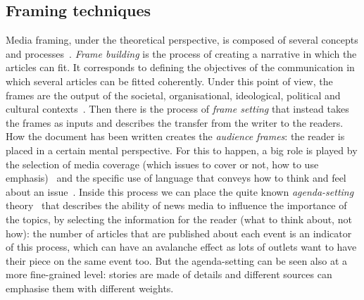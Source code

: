 \subsection{Framing techniques}
\label{ssec:lit_framing_theory}


Media framing, under the theoretical perspective, is composed of several concepts and processes~\cite{scheufele2007framing}.
\textit{Frame building} is the process of creating a narrative in which the articles can fit. It corresponds to defining the objectives of the communication in which several articles can be fitted coherently. Under this point of view, the frames are the output of the societal, organisational, ideological, political and cultural contexts~\cite{scheufele1999framing}.
Then there is the process of \textit{frame setting} that instead takes the frames as inputs and describes the transfer from the writer to the readers. How the document has been written creates the \emph{audience frames}: the reader is placed in a certain mental perspective. For this to happen, a big role is played by the selection of media coverage (which issues to cover or not, how to use emphasis)~\cite{iyengar1994anyone} and the specific use of language that conveys how to think and feel about an issue~\cite{bryant2012fundamentals}.
Inside this process we can place the quite known \emph{agenda-setting} theory~\cite{mccombs1972agenda} that describes the ability of news media to influence the importance of the topics, by selecting the information for the reader (what to think about, not how): %
the number of articles that are published about each event is an indicator of this process, which can have an avalanche effect as lots of outlets want to have their piece on the same event too.
But the agenda-setting can be seen also at a more fine-grained level: stories are made of details and different sources can emphasise them with different weights.

